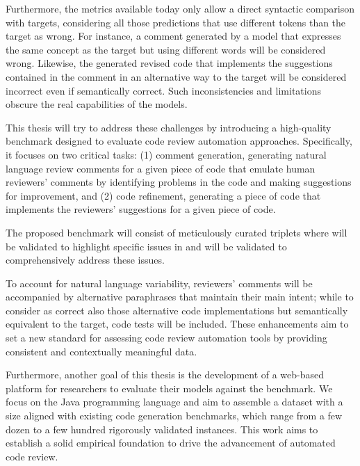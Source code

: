 Furthermore, the metrics available today only allow a direct syntactic comparison with targets,
considering all those predictions that use different tokens than the target as wrong. For instance,
a comment generated by a model that expresses the same concept as the target but using
different words will be considered wrong. Likewise, the generated revised code that implements
the suggestions contained in the comment in an alternative way to the target will be considered
incorrect even if semantically correct.
Such inconsistencies and limitations obscure the real capabilities of the models.


This thesis will try to address these challenges by introducing a high-quality
benchmark designed to evaluate code review automation approaches.
Specifically, it focuses on two critical tasks: (1) comment generation, \ie
generating natural language review comments for a given piece of code that emulate
human reviewers' comments by identifying problems in the code and making suggestions
for improvement, and (2) code refinement, \ie generating a piece of code that
implements the reviewers' suggestions for a given piece of code.

The proposed benchmark will consist of meticulously curated triplets where \revComment will be
validated to highlight specific issues in \subCode and \revCode will be validated to comprehensively
address these issues.

To account for natural language variability, reviewers' comments will be accompanied by
alternative paraphrases that maintain their main intent; while to consider as correct also
those alternative code implementations but semantically equivalent to the target, code tests will
be included. These enhancements aim to set a new standard for assessing code review
automation tools by providing consistent and contextually meaningful data.

Furthermore, another goal of this thesis is the development of a web-based platform for researchers
to evaluate their models against the benchmark. We focus on the Java programming language and aim to
assemble a dataset with a size aligned with existing code generation benchmarks, which range from a
few dozen to a few hundred rigorously validated instances. This work aims to establish a solid
empirical foundation to drive the advancement of automated code review.

